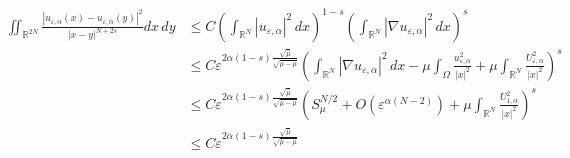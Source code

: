 \documentclass[11pt]{article}
\newcommand{\al} {\alpha}
\newcommand{\rnn}{\mathbb{R}^{N}}
\newcommand{\grad}{\nabla}
\begin{document}
\begin{equation}\label{eq:fractional_norm_bound}
\begin{aligned}
\iint_{\mathbb{R}^{2N}} \frac{| u_{\varepsilon,\al}(x) - u_{\varepsilon,\al}(y)|^2}{|x - y|^{N+2s}} dx \, dy & \leq C \left( \int_{\rnn} |u_{\varepsilon,\al}|^2 \, dx \right)^{1-s}\left( \int_{\rnn} |\grad u_{\varepsilon,\al}|^2\,dx\right)^s\\
& \leq C \varepsilon^{2\al(1-s) \frac{\sqrt{\bar{\mu}}}{\sqrt{\bar \mu - \mu}}} \left( \int_{\rnn} |\grad u_{\varepsilon,\al}|^2\,dx - \mu \int_{\Omega} \frac{u_{\varepsilon,\al}^2}{|x|^2} + \mu \int_{\rnn} \frac{U_{\varepsilon,\al}^2}{|x|^2} \right)^s\\
& \leq C \varepsilon^{2\al(1-s) \frac{\sqrt{\bar{\mu}}}{\sqrt{\bar \mu - \mu}}} \left(  S_{\mu}^{N/2} + O(\varepsilon^{\al (N-2)}) + \mu \int_{\rnn} \frac{U_{1,\al}^2}{|x|^2} \right)^s\\
& \leq C \varepsilon^{2\al(1-s) \frac{\sqrt{\bar{\mu}}}{\sqrt{\bar \mu - \mu}}}
\end{aligned}
\end{equation}
\end{document}
